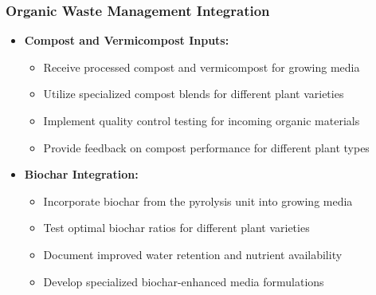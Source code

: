 \subsubsection{Organic Waste Management Integration}
\begin{itemize}
    \item \textbf{Compost and Vermicompost Inputs:}
    \begin{itemize}
        \item Receive processed compost and vermicompost for growing media
        \item Utilize specialized compost blends for different plant varieties
        \item Implement quality control testing for incoming organic materials
        \item Provide feedback on compost performance for different plant types
    \end{itemize}
    
    \item \textbf{Biochar Integration:}
    \begin{itemize}
        \item Incorporate biochar from the pyrolysis unit into growing media
        \item Test optimal biochar ratios for different plant varieties
        \item Document improved water retention and nutrient availability
        \item Develop specialized biochar-enhanced media formulations
    \end{itemize}
\end{itemize}

